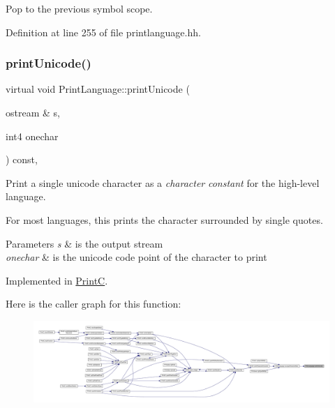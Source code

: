 Pop to the previous symbol scope. 



Definition at line 255 of file printlanguage.\+hh.

\mbox{\label{class_print_language_acfc5f922cf2befcad9b38ef1d55c35e3}} 
\subsubsection{\texorpdfstring{printUnicode()}{printUnicode()}}
{\footnotesize\ttfamily virtual void Print\+Language\+::print\+Unicode (\begin{DoxyParamCaption}\item[{ostream \&}]{s,  }\item[{int4}]{onechar }\end{DoxyParamCaption}) const\hspace{0.3cm}{\ttfamily [protected]}, {}}



Print a single unicode character as a {\itshape character} {\itshape constant} for the high-\/level language. 

For most languages, this prints the character surrounded by single quotes. 
\begin{DoxyParams}{Parameters}
{\em s} & is the output stream \\
\hline
{\em onechar} & is the unicode code point of the character to print \\
\hline
\end{DoxyParams}


Implemented in \mbox{\hyperlink{class_print_c_a56fdbb426ff8dda0d3dd29901f09ead1}{PrintC}}.

Here is the caller graph for this function\+:
\nopagebreak
\begin{figure}[H]
\begin{center}
\leavevmode
\includegraphics[width=350pt]{class_print_language_acfc5f922cf2befcad9b38ef1d55c35e3_icgraph}
\end{center}
\end{figure}
\mbox{\label{class_print_language_a08b82dcc9073756390dbee98a85d9a95}} 
